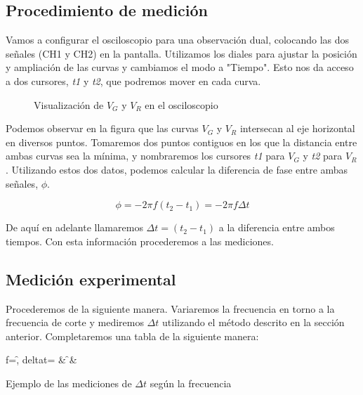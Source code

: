 \documentclass[12pt, a4paper, titlepage]{article}
\begin{document}
  \subsection{Procedimiento de medición}

  Vamos a configurar el osciloscopio para una observación dual, colocando las dos señales (CH1 y CH2) en la pantalla. Utilizamos los diales para ajustar la posición y ampliación de las curvas y cambiamos el modo a "Tiempo". Esto nos da acceso a dos cursores, \textit{t1} y \textit{t2}, que podremos mover en cada curva.

  \begin{figure}[H]
    \centering
    
    \caption{Visualización de $V_G$ y $V_R$ en el osciloscopio}
  \end{figure}

  Podemos observar en la figura que las curvas $V_G$ y $V_R$ intersecan al eje horizontal en diversos puntos. Tomaremos dos puntos contiguos en los que la distancia entre ambas curvas sea la mínima, y nombraremos los cursores \textit{t1} para $V_G$ y \textit{t2} para $V_R$. Utilizando estos dos datos, podemos calcular la diferencia de fase entre ambas señales, $\phi$.

  \begin{equation}
    \phi = -2\pi f (t_2 - t_1) = -2\pi f \Delta t
    \label{ec:desfase}
  \end{equation}

  De aquí en adelante llamaremos $\Delta t = (t_2 - t_1)$ a la diferencia entre ambos tiempos. Con esta información procederemos a las mediciones.

  \subsection{Medición experimental}

  Procederemos de la siguiente manera. Variaremos la frecuencia en torno a la frecuencia de corte y mediremos $\Delta t$ utilizando el método descrito en la sección anterior. Completaremos una tabla de la siguiente manera:

  \begin{table}[H]
  \centering
    {f=\f, deltat=\dt}
    {\thecsvrow & \f & \dt}
  \caption{Ejemplo de las mediciones de $\Delta t$ según la frecuencia}
  \end{table}
\end{document}
